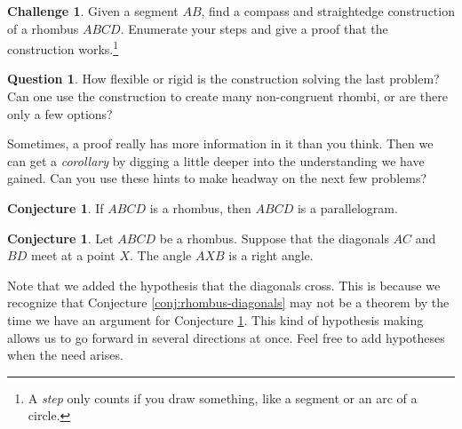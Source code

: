 \documentclass{tufte-handout}
\theoremstyle{definition}
\newtheorem{conjecture}[problem]{Conjecture}
\newtheorem{question}[problem]{Question}
\newtheorem{challenge}[problem]{Challenge}
\begin{document}
\begin{challenge}\label{prob:rhombus-construct}
Given a segment $AB$, find a compass and straightedge construction of a rhombus $ABCD$.
Enumerate your steps and give a proof that the construction works.\footnote{A \emph{step} only counts if you draw something, like a segment or an arc of a circle.}
\end{challenge}

\begin{question}\label{prob:rhombus-flexible}
How flexible or rigid is the construction solving the last problem?
Can one use the construction to create many non-congruent rhombi, or are there only a few options?
\end{question}

Sometimes, a proof really has more information in it than you think.
Then we can get a \emph{corollary} by digging a little deeper into the understanding we have gained.
Can you use these hints to make headway on the next few problems?

\begin{conjecture}\label{conj:rhombus-is-parallelogram}
If $ABCD$ is a rhombus, then $ABCD$ is a parallelogram.
\end{conjecture}


\begin{conjecture}\label{conj:rhombus-diagonals-angle}
Let $ABCD$ be a rhombus. Suppose that the diagonals $AC$ and $BD$ meet at a point $X$.
The angle $AXB$ is a right angle.
\end{conjecture}

Note that we added the hypothesis that the diagonals cross.
This is because we recognize that Conjecture \ref{conj:rhombus-diagonals} may not be a theorem by the time we have an argument for Conjecture \ref{conj:rhombus-diagonals-angle}.
This kind of hypothesis making allows us to go forward in several directions at once.
Feel free to add hypotheses when the need arises.
\end{document}
